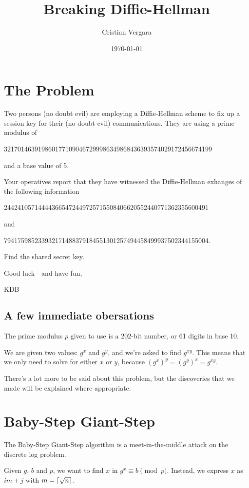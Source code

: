 \documentclass{article}
\author{Cristian Vergara}
\title{Breaking Diffie-Hellman}
\date{\today{}}
\DeclarePairedDelimiter{\ceil}{\lceil}{\rceil}
\begin{document}
  \maketitle{}
  \tableofcontents{}
  \newpage{}
  \section{The Problem}
    \begin{displayquote}
      Two persons (no doubt evil) are employing a Diffie-Hellman scheme to fix
      up a session key for their (no doubt evil) communications. They are
      using a prime modulus of

          3217014639198601771090467299986349868436393574029172456674199

          and a base value of  5.

          Your operatives report that they have witnessed the Diffie-Hellman
      exhanges of the following information

          244241057144443665472449725715508406620552440771362355600491

          and

          794175985233932171488379184551301257494458499937502344155004.

          Find the shared secret key.

      Good luck - and have fun,

      KDB
    \end{displayquote}
    \subsection{A few immediate obersations}
      The prime modulus $p$ given to use is a 202-bit number, or 61 digits in
      base 10.

      We are given two values: $g^x$ and $g^y$, and we're asked to find
      $g^{xy}$. This means that we only need to solve for either $x$ or $y$,
      because $(g^x)^y = (g^y)^x = g^{xy}$.

      There's a lot more to be said about this problem, but the discoveries that
      we made will be explained where appropriate.
  \section{Baby-Step Giant-Step}
    The Baby-Step Giant-Step algorithm is a meet-in-the-middle attack on the
    discrete log problem.

    Given $g$, $b$ and $p$, we want to find $x$ in $g^x \equiv b \pmod{p}$.
    Instead, we express $x$ as $im + j$ with $m = \ceil{\sqrt{n}}$.
  \newpage{}
  \printbibliography
\end{document}

